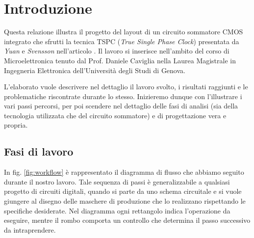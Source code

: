 
\chapter{Introduzione} %
\label{Chapter1} 


Questa relazione illustra il progetto del layout di un circuito sommatore CMOS integrato che sfrutti la tecnica TSPC (\textit{True Single Phase Clock}) presentata da \textit{Yuan} e \textit{Svensson} nell'articolo \cite{yuan1989high}. Il lavoro si inserisce nell'ambito del corso di Microelettronica tenuto dal Prof. Daniele Caviglia nella Laurea Magistrale in Ingegneria Elettronica dell'Università degli Studi di Genova.

L'elaborato vuole descrivere nel dettaglio il lavoro svolto, i risultati raggiunti e le problematiche riscontrate durante lo stesso. Inizieremo dunque con l'illustrare i vari passi percorsi, per poi scendere nel dettaglio delle fasi di analisi (sia della tecnologia utilizzata che del circuito sommatore) e di progettazione vera e propria.

\section{Fasi di lavoro}
\label{sec:sec_fasiLavoro}

In fig. \ref{fig:workflow} è rappresentato il diagramma di flusso che abbiamo seguito durante il nostro lavoro. Tale sequenza di passi è generalizzabile a qualsiasi progetto di circuiti digitali, quando si parte da uno schema circuitale e si vuole giungere al disegno delle maschere di produzione che lo realizzano rispettando le specifiche desiderate. Nel diagramma ogni rettangolo indica l'operazione da eseguire, mentre il rombo comporta un controllo che determina il passo successivo da intraprendere. 

